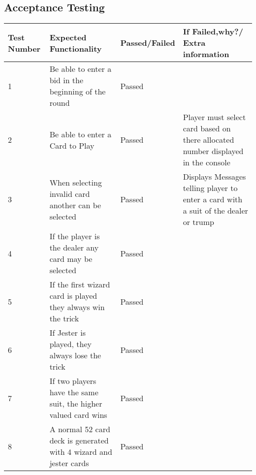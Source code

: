 \subsection{Acceptance Testing}
\begin{center}
\begin{table}
   \begin{tabular}{| l | p{5cm} | l | p{5cm} |}
        \hline
        Test Number & Expected Functionality                                                                            & Passed/Failed & If Failed,why?/ Extra information                                                   \\ \hline
        1           & Be able to enter a bid in the beginning of the round                                              & Passed        & ~                                                                                   \\ \hline
        2           & Be able to enter a Card to Play                                                                    & Passed        & Player must select card based on there allocated number displayed in the console    \\ \hline
        3           & When selecting invalid card another can be selected                                               & Passed        & Displays Messages telling player to enter a card with a suit of the dealer or trump \\ \hline
        4           & If the player is the dealer any card may be selected                                              & Passed        & ~                                                                                   \\ \hline
        5           & If the first wizard card is played they always win the trick                                      & Passed        & ~                                                                                   \\ \hline
        6           & If Jester is played, they always lose the trick                                                   & Passed        & ~                                                                                   \\ \hline
        7           & If two players have the same suit, the higher valued card wins                                    & Passed        & ~                                                                                   \\ \hline
        8           & A normal 52 card deck is generated with 4 wizard and jester cards                                 & Passed        & ~                                                                                   \\ \hline

\end{tabular}
\end{table}
\end{center}
